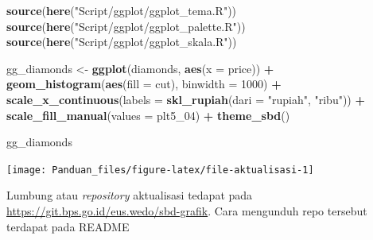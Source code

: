 \documentclass[]{book}
\newenvironment{Shaded}{\begin{snugshade}}{\end{snugshade}}
\newcommand{\KeywordTok}[1]{\textcolor[rgb]{0.13,0.29,0.53}{\textbf{#1}}}
\newcommand{\DataTypeTok}[1]{\textcolor[rgb]{0.13,0.29,0.53}{#1}}
\newcommand{\DecValTok}[1]{\textcolor[rgb]{0.00,0.00,0.81}{#1}}
\newcommand{\StringTok}[1]{\textcolor[rgb]{0.31,0.60,0.02}{#1}}
\newcommand{\OperatorTok}[1]{\textcolor[rgb]{0.81,0.36,0.00}{\textbf{#1}}}
\newcommand{\NormalTok}[1]{#1}
\begin{document}
\begin{Shaded}
\begin{Highlighting}[]
\KeywordTok{source}\NormalTok{(}\KeywordTok{here}\NormalTok{(}\StringTok{"Script/ggplot/ggplot_tema.R"}\NormalTok{))}
\KeywordTok{source}\NormalTok{(}\KeywordTok{here}\NormalTok{(}\StringTok{"Script/ggplot/ggplot_palette.R"}\NormalTok{))}
\KeywordTok{source}\NormalTok{(}\KeywordTok{here}\NormalTok{(}\StringTok{"Script/ggplot/ggplot_skala.R"}\NormalTok{))}

\NormalTok{gg_diamonds <-}\StringTok{ }\KeywordTok{ggplot}\NormalTok{(diamonds, }\KeywordTok{aes}\NormalTok{(}\DataTypeTok{x =}\NormalTok{ price)) }\OperatorTok{+}
\StringTok{  }\KeywordTok{geom_histogram}\NormalTok{(}\KeywordTok{aes}\NormalTok{(}\DataTypeTok{fill =}\NormalTok{ cut), }\DataTypeTok{binwidth =} \DecValTok{1000}\NormalTok{) }\OperatorTok{+}
\StringTok{  }\KeywordTok{scale_x_continuous}\NormalTok{(}\DataTypeTok{labels =} \KeywordTok{skl_rupiah}\NormalTok{(}\DataTypeTok{dari =} \StringTok{"rupiah"}\NormalTok{, }\StringTok{"ribu"}\NormalTok{)) }\OperatorTok{+}
\StringTok{  }\KeywordTok{scale_fill_manual}\NormalTok{(}\DataTypeTok{values =}\NormalTok{ plt5_}\DecValTok{04}\NormalTok{) }\OperatorTok{+}
\StringTok{  }\KeywordTok{theme_sbd}\NormalTok{()}

\NormalTok{gg_diamonds}
\end{Highlighting}
\end{Shaded}

\begin{center}\texttt{[image: Panduan\_files/figure-latex/file-aktualisasi-1]} \end{center}

Lumbung atau \emph{repository} aktualisasi tedapat pada
\url{https://git.bps.go.id/eus.wedo/sbd-grafik}. Cara mengunduh repo
tersebut terdapat pada README


\end{document}
